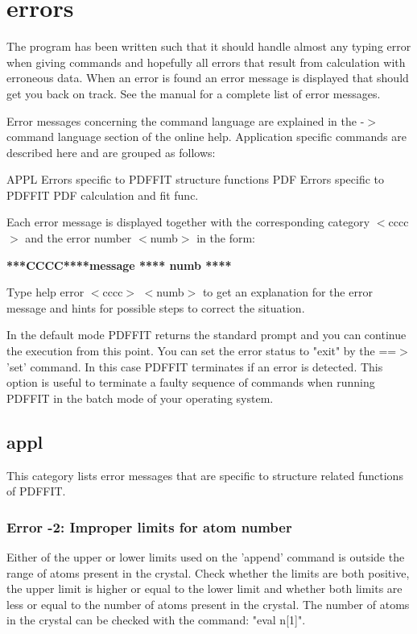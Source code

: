 \section{errors}
\par
The program has been written such that it should handle almost 
any typing error when giving commands and hopefully all errors 
that result from calculation with erroneous data. When an error 
is found an error message is displayed that should get you back 
on track. See the manual for a complete list of error messages. 
\par
Error messages concerning the command language are explained in 
the -$> $ command language section of the online help. Application 
specific commands are described here and are grouped as follows: 
\par
\begin{MacVerbatim}
APPL   Errors specific to PDFFIT structure functions
PDF    Errors specific to PDFFIT PDF calculation and fit func.
\end{MacVerbatim}
Each error message is displayed together with the corresponding 
category $ <$cccc$> $ and the error number $ <$numb$> $ in the form: 
\par
{\bf ****CCCC****message                    **** numb **** \par }
\par
\vspace{3pt}
Type help error $ <$cccc$> $ $ <$numb$> $ to get an explanation for the error 
message and hints for possible steps to correct the situation. 
\par
In the default mode PDFFIT returns the standard prompt and you can 
continue the execution from this point. You can set the error status 
to "exit" by the ==$> $'set' command. In this case PDFFIT terminates 
if an error is detected. This option is useful to terminate a faulty 
sequence of commands when running PDFFIT in the batch mode of your 
operating system. 
\par
\subsection*{appl}
\par
This category lists error messages that are specific to 
structure related functions of PDFFIT. 
\par
\subsubsection{Error -2: Improper limits for atom number}
\par
Either of the upper or lower limits used on the 'append' command is 
outside the range of atoms present in the crystal. Check whether 
the limits are both positive, the upper limit is higher or equal to 
the lower limit and whether both limits are less or equal to the 
number of atoms present in the crystal. The number of atoms in the 
crystal can be checked with the command: "eval n[1]". 
